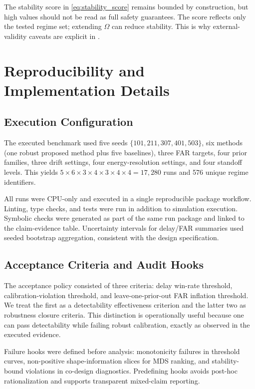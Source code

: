 The stability score in \eqref{eq:stability_score} remains bounded by construction, but high values should not be read as full safety guarantees. The score reflects only the tested regime set; extending $\Omega$ can reduce stability. This is why external-validity caveats are explicit in .

\section{Reproducibility and Implementation Details}\label{sec:appendix_reproducibility}
\subsection{Execution Configuration}
The executed benchmark used five seeds $\{101,211,307,401,503\}$, six methods (one robust proposed method plus five baselines), three FAR targets, four prior families, three drift settings, four energy-resolution settings, and four standoff levels. This yields $5\times 6\times 3\times 4\times 3\times 4\times 4=17{,}280$ runs and 576 unique regime identifiers.

All runs were CPU-only and executed in a single reproducible package workflow. Linting, type checks, and tests were run in addition to simulation execution. Symbolic checks were generated as part of the same run package and linked to the claim-evidence table. Uncertainty intervals for delay/FAR summaries used seeded bootstrap aggregation, consistent with the design specification.

\subsection{Acceptance Criteria and Audit Hooks}
The acceptance policy consisted of three criteria: delay win-rate threshold, calibration-violation threshold, and leave-one-prior-out FAR inflation threshold. We treat the first as a detectability effectiveness criterion and the latter two as robustness closure criteria. This distinction is operationally useful because one can pass detectability while failing robust calibration, exactly as observed in the executed evidence.

Failure hooks were defined before analysis: monotonicity failures in threshold curves, non-positive shape-information slices for MDS ranking, and stability-bound violations in co-design diagnostics. Predefining hooks avoids post-hoc rationalization and supports transparent mixed-claim reporting.

